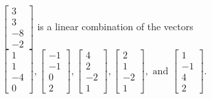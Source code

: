 \begin{exercise}
\begin{exerciseStatement}
  \end{exerciseStatement}
  \begin{exerciseAnswer}
   \(\left[\begin{array}{c}
3 \\
3 \\
-8 \\
-2
\end{array}\right]\) 
  	 is  
	a linear combination of the vectors \(\left[\begin{array}{c}
1 \\
1 \\
-4 \\
0
\end{array}\right] , \left[\begin{array}{c}
-1 \\
-1 \\
0 \\
2
\end{array}\right] , \left[\begin{array}{c}
4 \\
2 \\
-2 \\
1
\end{array}\right] , \left[\begin{array}{c}
2 \\
1 \\
-2 \\
1
\end{array}\right] , \text{ and } \left[\begin{array}{c}
1 \\
-1 \\
4 \\
2
\end{array}\right]\).

	
  


  \end{exerciseAnswer}
\end{exercise}